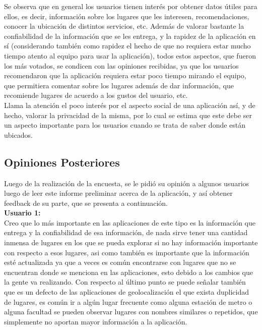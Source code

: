 \documentclass[10pt,letterpaper]{article}
\begin{document}
Se observa que en general los usuarios tienen interés por obtener datos útiles para ellos, es decir, información sobre los lugares que les interesen, recomendaciones, conocer la ubicación de distintos servicios, etc. Además de valorar bastante la confiabilidad de la información que se les entrega, y la rapidez de la aplicación en sí (considerando también como rapidez el hecho de que no requiera estar mucho tiempo atento al equipo para usar la aplicación), todos estos aspectos, que fueron los más votados, se condicen con las opiniones recibidas, ya que los usuarios recomendaron que la aplicación requiera estar poco tiempo mirando el equipo, que permitiera comentar sobre los lugares además de dar información, que recomiende lugares de acuerdo a los gustos del usuario, etc.\\

Llama la atención el poco interés por el aspecto social de una aplicación así, y de hecho, valorar la privacidad de la misma, por lo cual se estima que este debe ser un aspecto importante para los usuarios cuando se trata de saber donde están ubicados.\\

\subsection{Opiniones Posteriores}

Luego de la realización de la encuesta, se le pidió su opinión a algunos usuarios luego de leer este informe preliminar acerca de la aplicación, y así obtener feedback de su parte, que se presenta a continuación.\\

\textbf{Usuario 1:}\\

Creo que lo más importante en las aplicaciones de este tipo es la información que entrega y la confiabilidad de esa información, de nada sirve tener una cantidad inmensa de lugares en los que se pueda explorar si no hay información importante con respecto a esos lugares, asi como también es importante que la información esté actualizada ya que a veces es común encontrarse con lugares que no se encuentran donde se menciona en las aplicaciones, esto debido a los cambios que la gente va realizando. Con respecto al último punto se puede señalar también que es un defecto de las aplicaciones de geolocalización el que exista duplicidad de lugares, es común ir a algún lugar frecuente como alguna estación de metro o alguna facultad se pueden observar lugares con nombres similares o repetidos, que simplemente no aportan mayor información a la aplicación.\\
\end{document}
